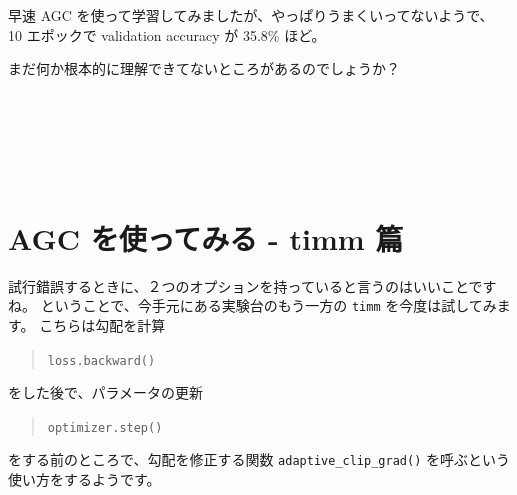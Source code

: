 \documentclass[dvipdfmx,autodetect-engine,10pt,b5paper,papersize,openany,dvipsnames]{jsbook}
\begin{document}
\begin{multicols}{2}
\vspace{5.0cm}

早速 AGC を使って学習してみましたが、やっぱりうまくいってないようで、
10 エポックで validation accuracy が 35.8\% ほど。


\vspace{5.0cm}

まだ何か根本的に理解できてないところがあるのでしょうか？





\section{AGC を使ってみる - timm 篇}
試行錯誤するときに、２つのオプションを持っていると言うのはいいことですね。
ということで、今手元にある実験台のもう一方の \texttt{timm} を今度は試してみます。
こちらは勾配を計算
\begin{quote}
  \texttt{loss.backward()}
\end{quote}
をした後で、パラメータの更新
\begin{quote}
  \texttt{optimizer.step()}
\end{quote}
をする前のところで、勾配を修正する関数
\texttt{adaptive\_clip\_grad()} を呼ぶという使い方をするようです。



\end{multicols}
\end{document}
